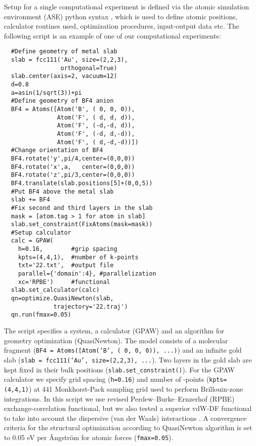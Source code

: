 \documentclass[a4paper,10pt]{article}
\begin{document}
Setup for a single computational experiment is defined via the atomic simulation environment (ASE) python syntax \cite{ase}, which is used to define atomic positions, calculator routines used, optimization procedures, input-output data etc. The following script is an example of one of our computational experiments:

\begin{lstlisting}
  #Define geometry of metal slab
  slab = fcc111('Au', size=(2,2,3),
                orthogonal=True)
  slab.center(axis=2, vacuum=12)
  d=0.8
  a=asin(1/sqrt(3))+pi
  #Define geometry of BF4 anion
  BF4 = Atoms([Atom('B', ( 0, 0, 0)),
               Atom('F', ( d, d, d)),
               Atom('F', (-d,-d, d)),
               Atom('F', (-d, d,-d)),
               Atom('F', ( d,-d,-d))])
  #Change orientation of BF4
  BF4.rotate('y',pi/4,center=(0,0,0))
  BF4.rotate('x',a,   center=(0,0,0))
  BF4.rotate('z',pi/3,center=(0,0,0))
  BF4.translate(slab.positions[5]+(0,0,5))
  #Put BF4 above the metal slab
  slab += BF4
  #Fix second and third layers in the slab
  mask = [atom.tag > 1 for atom in slab]
  slab.set_constraint(FixAtoms(mask=mask))
  #Setup calculator
  calc = GPAW(
    h=0.16,        #grip spacing
    kpts=(4,4,1),  #number of k-points
    txt='22.txt',  #output file
    parallel={'domain':4}, #parallelization
    xc='RPBE')     #functional
  slab.set_calculator(calc)
  qn=optimize.QuasiNewton(slab,
              trajectory='22.traj')
  qn.run(fmax=0.05)
\end{lstlisting}

The script specifies a system, a calculator (GPAW) and an algorithm for geometry optimization (QuasiNewton). The model consists of a molecular fragment (\texttt{BF4 = Atoms([Atom('B', ( 0, 0, 0)), ...)}) and an infinite gold slab (\texttt{slab = fcc111('Au', size=(2,2,3), ...}). Two layers in the gold slab are kept fixed in their bulk positions (\texttt{slab.set\_constraint()}). For the GPAW calculator we specify grid spacing (\texttt{h=0.16}) and number of -points (\texttt{kpts=(4,4,1)}) at 441 Monkhorst-Pack sampling grid used to perform Brillouin-zone integrations. In this script we use revised Perdew--Burke--Ernzerhof (RPBE) exchange-correlation functional, but we also tested a superior vdW-DF functional to take into account the dispersive (van der Waals) interactions \cite{ivanistsev2012}. A convergence criteria for the structural optimization according to QuasiNewton algorithm is set to 0.05 eV per \r{A}ngstr\"{o}m for atomic forces (\texttt{fmax=0.05}). 
\end{document}
